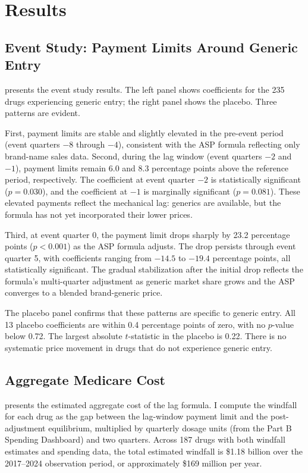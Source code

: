 \documentclass[12pt]{article}
\begin{document}
\section{Results}\label{sec:results}

\subsection{Event Study: Payment Limits Around Generic Entry}

 presents the event study results. The left panel shows coefficients for the 235 drugs experiencing generic entry; the right panel shows the placebo. Three patterns are evident.

First, payment limits are stable and slightly elevated in the pre-event period (event quarters $-8$ through $-4$), consistent with the ASP formula reflecting only brand-name sales data. Second, during the lag window (event quarters $-2$ and $-1$), payment limits remain 6.0 and 8.3 percentage points above the reference period, respectively. The coefficient at event quarter $-2$ is statistically significant ($p = 0.030$), and the coefficient at $-1$ is marginally significant ($p = 0.081$). These elevated payments reflect the mechanical lag: generics are available, but the formula has not yet incorporated their lower prices.

Third, at event quarter 0, the payment limit drops sharply by 23.2 percentage points ($p < 0.001$) as the ASP formula adjusts. The drop persists through event quarter 5, with coefficients ranging from $-14.5$ to $-19.4$ percentage points, all statistically significant. The gradual stabilization after the initial drop reflects the formula's multi-quarter adjustment as generic market share grows and the ASP converges to a blended brand-generic price.

The placebo panel confirms that these patterns are specific to generic entry. All 13 placebo coefficients are within 0.4 percentage points of zero, with no $p$-value below 0.72. The largest absolute $t$-statistic in the placebo is 0.22. There is no systematic price movement in drugs that do not experience generic entry.



\subsection{Aggregate Medicare Cost}

 presents the estimated aggregate cost of the lag formula. I compute the windfall for each drug as the gap between the lag-window payment limit and the post-adjustment equilibrium, multiplied by quarterly dosage units (from the Part B Spending Dashboard) and two quarters. Across 187 drugs with both windfall estimates and spending data, the total estimated windfall is \$1.18 billion over the 2017--2024 observation period, or approximately \$169 million per year.
\end{document}
